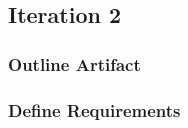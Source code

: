 

%




\subsection{Iteration 2}

\subsubsection*{Outline Artifact}


\subsubsection*{Define Requirements}


